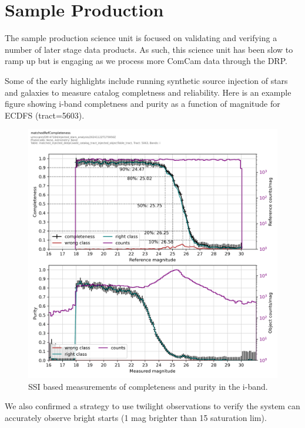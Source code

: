 \section{Sample Production}
\label{sec:sample_production}

The sample production science unit is focused on validating and verifying a number of later stage data products. 
As such, this science unit has been slow to ramp up but is engaging as we process more ComCam data through the DRP. 

Some of the early highlights include running synthetic source injection of stars and galaxies to measure catalog completness and reliability. 
Here is an example figure showing i-band completness and purity as a function of magnitude for ECDFS (tract=5603).
\begin{figure}
    \includegraphics{sample_production_figures/matched_ref_completness_ssi_i.png}
    \caption{SSI based measurements of completeness and purity in the i-band.}
\end{figure}

We also confirmed a strategy to use twilight observations to verify the system can accurately observe bright starts (1 mag brighter than 15 saturation lim). 

  
  